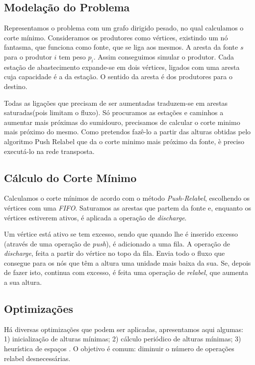 \documentclass[a4paper, 12pt, conference, portuguese]{ieeeconf}
\begin{document}
\subsection{Modelação do Problema}

Representamos o problema com um grafo dirigido pesado, no qual
calculamos o corte mínimo. Consideramos os produtores como
vértices, existindo um nó fantasma, que funciona como fonte, que
se liga aos mesmos. A aresta da fonte $s$ para o produtor $i$ tem
peso $p_i$. Assim conseguimos simular o produtor. Cada estação de
abastecimento expande-se em dois vértices, ligados com uma aresta
cuja capacidade é a da estação. O sentido da aresta é dos produtores
para o destino.

Todas as ligações que precisam de ser aumentadas traduzem-se em arestas
saturadas(pois limitam o fluxo). Só procuramos as estações e
caminhos a aumentar mais próximas do sumidouro, precisamos de calcular
o corte minimo mais próximo do mesmo. Como pretendos fazê-lo a partir
das alturas obtidas pelo algoritmo Push Relabel que da o corte minimo
mais próximo da fonte, è preciso executá-lo na rede transposta.

\subsection{Cálculo do Corte Mínimo}
Calculamos o corte mínimos de acordo com o método
\textit{Push-Relabel}\cite{pre-flow}, escolhendo os vértices com
uma \textit{FIFO}. Saturamos as arestas que
partem da fonte e, enquanto os vértices estiverem ativos, é
aplicada a operação de \textit{discharge}.

Um vértice está ativo se tem excesso, sendo que quando lhe é
inserido excesso (através de uma operação de \textit{push}), é adicionado
a uma fila. A operação de \textit{discharge}, feita a partir do vértice
no topo da fila. Envia todo o fluxo que consegue para os nós que
têm a altura uma unidade mais baixa da sua. Se, depois de fazer
isto, continua com excesso, é feita uma operação de
\textit{relabel}, que aumenta a sua altura.

\subsection{Optimizações}

Há diversas optimizações que podem ser aplicadas, apresentamos
aqui algumas: 1) inicialização de alturas mínimas; 2) cálculo
periódico de alturas mínimas; 3) heurística de espaços .
O objetivo é comum: diminuir o número de operações relabel desnecessárias.
\end{document}
